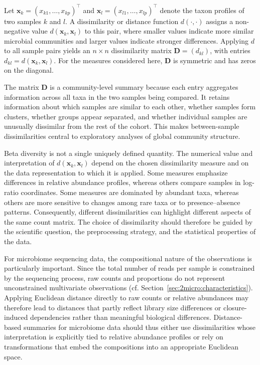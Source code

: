 Let $\mathbf{x}_k=(x_{k1},\ldots,x_{kp})^\top$ and $\mathbf{x}_l=(x_{l1},\ldots,x_{lp})^\top$ denote the taxon profiles of two samples $k$ and $l$. A dissimilarity or distance function $d(\cdot,\cdot)$ assigns a non-negative value $d(\mathbf{x}_k,\mathbf{x}_l)$ to this pair, where smaller values indicate more similar microbial communities and larger values indicate stronger differences. Applying $d$ to all sample pairs yields an $n \times n$ dissimilarity matrix $\mathbf{D}=(d_{kl})$, with entries $d_{kl}=d(\mathbf{x}_k,\mathbf{x}_l)$. For the measures considered here, $\mathbf{D}$ is symmetric and has zeros on the diagonal.

The matrix $\mathbf{D}$ is a community-level summary because each entry aggregates information across all taxa in the two samples being compared. It retains information about which samples are similar to each other, whether samples form clusters, whether groups appear separated, and whether individual samples are unusually dissimilar from the rest of the cohort. This makes between-sample dissimilarities central to exploratory analyses of global community structure.

\newpage
Beta diversity is not a single uniquely defined quantity. The numerical value and interpretation of $d(\mathbf{x}_k,\mathbf{x}_l)$ depend on the chosen dissimilarity measure and on the data representation to which it is applied. Some measures emphasize differences in relative abundance profiles, whereas others compare samples in log-ratio coordinates. Some measures are dominated by abundant taxa, whereas others are more sensitive to changes among rare taxa or to presence--absence patterns. Consequently, different dissimilarities can highlight different aspects of the same count matrix. The choice of dissimilarity should therefore be guided by the scientific question, the preprocessing strategy, and the statistical properties of the data.

For microbiome sequencing data, the compositional nature of the observations is particularly important. Since the total number of reads per sample is constrained by the sequencing process, raw counts and proportions do not represent unconstrained multivariate observations (cf. Section~\ref{sec:2micro:characteristics}). Applying Euclidean distance directly to raw counts or relative abundances may therefore lead to distances that partly reflect library size differences or closure-induced dependencies rather than meaningful biological differences. Distance-based summaries for microbiome data should thus either use dissimilarities whose interpretation is explicitly tied to relative abundance profiles or rely on transformations that embed the compositions into an appropriate Euclidean space.

